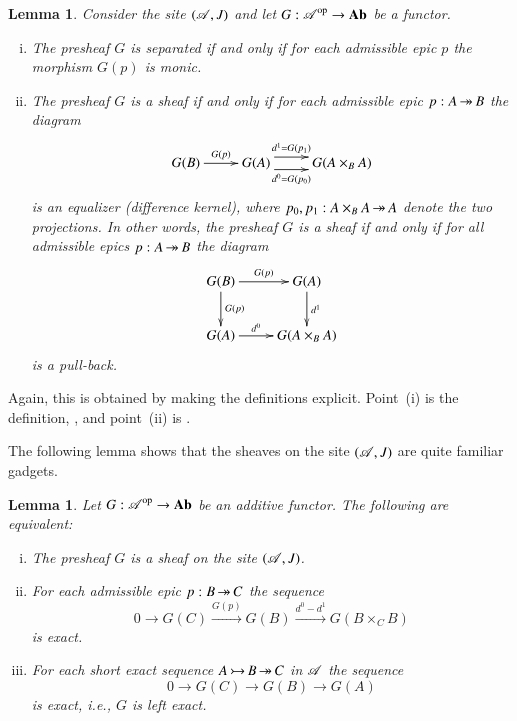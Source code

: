 \documentclass[1p]{elsarticle}
\makeatletter
\renewenvironment{proof}[1][\proofname]{\par
  \pushQED{\qed}%
  \normalfont \topsep6\p@\@plus6\p@\relax
  \trivlist
  \item[\hskip\labelsep
        \scshape
    #1\@addpunct{.}]\ignorespaces
}{%
  \popQED\endtrivlist\@endpefalse
}
\theoremstyle{mythm}
\newtheorem{Lem}[Thm]{Lemma}
\theoremstyle{mydef}
\makeatother
\begin{document}
\begin{Lem}
  \label{lem:separated-sheafs}
  Consider the site $(\operatorname{\mathscr{A}},J)$ and let
  $G: \operatorname{\mathscr{A}}^{\operatorname{op}} \to \operatorname{\mathbf{Ab}}$ be a functor.
  \begin{enumerate}[(i)]
    \item
      The presheaf $G$ is \emph{separated} if and only if for each
      admissible epic $p$ the morphism $G(p)$ is monic.
 
    \item
      The presheaf $G$ is a \emph{sheaf} if and only if for each
      admissible epic $p: A \operatorname{\twoheadrightarrow} B$ the diagram
      \[
      \xymatrix{
        G(B) \ar[r]^-{G(p)} &
        G(A) \ar@<-1ex>[r]_-{d^{0} = G(p_{0})}
        \ar@<1ex>[r]^-{d^{1} = G(p_{1})} &
        G(A \times_{B} A)
      }
      \]
      is an \emph{equalizer} (difference kernel), where
      $p_{0}, p_{1} : A \times_{B} A \operatorname{\twoheadrightarrow} A$ denote the two
      projections.
      In other words, the presheaf $G$ is a sheaf if and only if for
      all admissible epics $p: A \operatorname{\twoheadrightarrow} B$ the diagram
      \[
      \xymatrix{
        G(B) \ar[r]^-{G(p)} \ar[d]^-{G(p)} & G(A) \ar[d]^-{d^{1}} \\
        G(A) \ar[r]^-{d^{0}} & G(A \times_{B} A)
      }
      \]
      is a pull-back.
  \end{enumerate}
\end{Lem}

\begin{proof}
  Again, this is obtained by making the definitions
  explicit. Point~(i) is the definition, \cite[p.~129]{MR1300636}, and
  point~(ii) is \cite[Proposition~1{[bis]}, p.~123]{MR1300636}.
\end{proof}

The following lemma shows that the sheaves on the site $(\operatorname{\mathscr{A}},J)$
are quite familiar gadgets. 

\begin{Lem}
  \label{lem:sheaf=left-exact}
  Let $G: \operatorname{\mathscr{A}}^{\operatorname{op}} \to \operatorname{\mathbf{Ab}}$ be an additive functor. The following
  are equivalent:
  \begin{enumerate}[(i)]
    \item
      The presheaf $G$ is a sheaf on the site $(\operatorname{\mathscr{A}}, J)$.
      
    \item
      For each admissible epic $p: B \operatorname{\twoheadrightarrow} C$ the sequence
      \[
      0 \xrightarrow{} G(C) \xrightarrow{G(p)} 
      G(B) \xrightarrow{d^{0}-d^{1}} G(B \times_{C} B)
      \]
      is exact.

    \item
      For each short exact sequence $A \operatorname{\rightarrowtail} B \operatorname{\twoheadrightarrow} C$ in $\operatorname{\mathscr{A}}$ 
      the sequence 
      \[
      0 \xrightarrow{} G(C) \xrightarrow{} G(B) \xrightarrow{} G(A)
      \]
      is exact, i.e., $G$ is \emph{left exact}.
  \end{enumerate}
\end{Lem}
\end{document}
